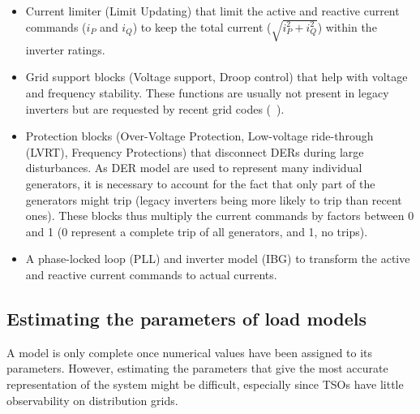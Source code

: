 \begin{itemize}
    \item Current limiter (Limit Updating) that limit the active and reactive current commands (\(i_P\) and \(i_Q\)) to keep the total current (\(\sqrt{i_P^2 + i_Q^2}\)) within the inverter ratings.
    \item Grid support blocks (Voltage support, Droop control) that help with voltage and frequency stability. These functions are usually not present in legacy inverters but are requested by recent grid codes (\eg~\cite{G99}).
    \item Protection blocks (Over-Voltage Protection, Low-voltage ride-through (LVRT), Frequency Protections) that disconnect DERs during large disturbances. As DER model are used to represent many individual generators, it is necessary to account for the fact that only part of the generators might trip (legacy inverters being more likely to trip than recent ones). These blocks thus multiply the current commands by factors between 0 and 1 (0 represent a complete trip of all generators, and 1, no trips).
    \item A phase-locked loop (PLL) and inverter model (IBG) to transform the active and reactive current commands to actual currents.
\end{itemize}




\subsection{Estimating the parameters of load models}
\label{sec:load_parameters}

A model is only complete once numerical values have been assigned to its parameters. However, estimating the parameters that give the most accurate representation of the system might be difficult, especially since TSOs have little observability on distribution grids.


